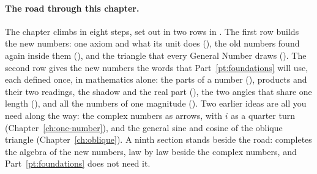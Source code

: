 \paragraph{The road through this chapter.}
The chapter climbs in eight steps, set out in two rows in . The first row builds the new numbers: one axiom and what its unit does (), the old numbers found again inside them (), and the triangle that every General Number draws (). The second row gives the new numbers the words that Part~\ref{pt:foundations} will use, each defined once, in mathematics alone: the parts of a number (), products and their two readings, the shadow and the real part (), the two angles that share one length (), and all the numbers of one magnitude (). Two earlier ideas are all you need along the way: the complex numbers as arrows, with $i$ as a quarter turn (Chapter~\ref{ch:one-number}), and the general sine and cosine of the oblique triangle (Chapter~\ref{ch:oblique}). A ninth section stands beside the road:  completes the algebra of the new numbers, law by law beside the complex numbers, and Part~\ref{pt:foundations} does not need it.

